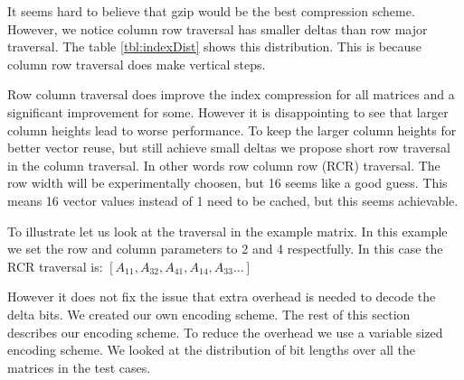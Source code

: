 \indent It seems hard to believe that gzip would be the best compression scheme. However, we notice column row traversal has smaller deltas than row major traversal. The table \ref{tbl:indexDist} shows this distribution. This is because column row traversal does make vertical steps.
\par Row column traversal does improve the index compression for all matrices and a significant improvement for some. However it is disappointing to see that larger column heights lead to worse performance. To keep the larger column heights for better vector reuse, but still achieve small deltas we propose short row traversal in the column traversal. In other words row column row (RCR) traversal. The row width will be experimentally choosen, but 16 seems like a good guess. This means 16 vector values instead of 1 need to be cached, but this seems achievable.
\par To illustrate let us look at the traversal in the example matrix. In this example we set the row and column parameters to 2 and 4 respectfully. In this case the RCR traversal is: $[A_{11}, A_{32}, A_{41}, A_{14}, A_{33} \dots]$\\
\par However it does not fix the issue that extra overhead is needed to decode the delta bits. We created our own encoding scheme. The rest of this section describes our encoding scheme. To reduce the overhead we use a variable sized encoding scheme. We looked at the distribution of bit lengths over all the matrices in the test cases. 





